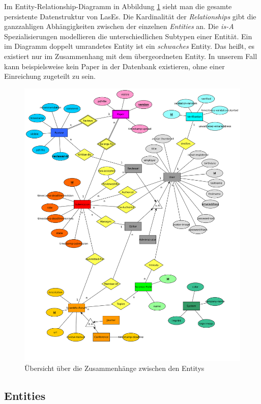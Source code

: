 
Im Entity-Relationship-Diagramm in Abbildung \ref{er:diagramm} sieht man die gesamte persistente Datenstruktur von LasEs. Die Kardinalität der \emph{Relationships} gibt die ganzzahligen Abhängigkeiten zwischen der einzelnen \emph{Entities} an. Die \emph{is-A} Spezialisierungen modellieren die unterschiedlichen Subtypen einer Entität. Ein im Diagramm doppelt umrandetes Entity ist ein \emph{schwaches} Entity. Das heißt, es existiert nur im Zusammenhang mit dem übergeordneten Entity. In unserem Fall kann beispielsweise kein Paper in der Datenbank existieren, ohne einer Einreichung zugeteilt zu sein.

\begin{figure}
	\centering
	\includegraphics[width=\linewidth]{graphics/ER-Modell}
	\caption{Übersicht über die Zusammenhänge zwischen den Entitys}
	\label{er:diagramm}
\end{figure}

\subsection{Entities}

